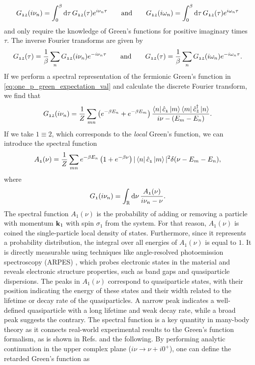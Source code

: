 \documentclass[\main/main.tex]{subfiles}
\begin{document}
\begin{align}
	G_{\mathfrak{12}}(i\nu_n)=\int_{0}^{\beta}\text{d}\tau\,G_{\mathfrak{12}}(\tau) e^{i\nu_n\tau} \qquad\text{and}\qquad G_{\mathfrak{12}}(i\omega_n)=\int_{0}^{\beta}\text{d}\tau\,G_{\mathfrak{12}}(\tau) e^{i\omega_n\tau}
\end{align}
and only require the knowledge of Green's functions for positive imaginary times $\tau$. The inverse Fourier transforms are given by
\begin{align}
	G_{\mathfrak{12}}(\tau)=\frac1\beta \sum_n G_{\mathfrak{12}}(i\nu_n) e^{-i\nu_n\tau} \qquad\text{and}\qquad G_{\mathfrak{12}}(\tau)=\frac1\beta \sum_n G_{\mathfrak{12}}(i\omega_n) e^{-i\omega_n\tau}.
\end{align}
If we perform a spectral representation of the fermionic Green's function in \eqref{eq:one_p_green_expectation_val} and calculate the discrete Fourier transform, we find that
\begin{align}
	G_{\mathfrak{12}}(i\nu_n)=\frac1Z\sum_{mn}\left (e^{-\beta E_n}+e^{-\beta E_m}\right )\frac{\bra{n} \hat c_{\mathfrak{1}} \ket{m}\bra{m} \hat c^{\dagger}_{\mathfrak{2}} \ket{n}}{i\nu-(E_m-E_n)}.
\end{align}
If we take $\mathfrak{1}\equiv \mathfrak{2}$, which corresponds to the \textit{local} Green's function, we can introduce the spectral function
\begin{align}
	A_{\mathfrak{1}}(\nu)=\frac1Z\sum_{mn} e^{-\beta E_n}\left (1+e^{-\beta\nu}\right ) |\bra{n} \hat c_{\mathfrak{1}} \ket{m}|^2 \delta(\nu-E_m-E_n),
\end{align}
where
\begin{align}
	G_{\mathfrak{1}}(i\nu_n)=\int_{\mathbb{R}}^{}\text{d}\nu\,\frac{A_{\mathfrak{1}}(\nu)}{i\nu_n-\nu}.
\end{align}
The spectral function $A_{\mathfrak{1}}(\nu)$ is the probability of adding or removing a particle with momentum $\textbf{k}_1$ with spin $\sigma_1$ from the system. For that reason, $A_{\mathfrak{1}}(\nu)$ is coined the single-particle local density of states. Furthermore, since it represents a probability distribution, the integral over all energies of $A_{\mathfrak{1}}(\nu)$ is equal to $1$. It is directly measurable using techniques like angle-resolved photoemission spectroscopy (ARPES) \cite{Hwang2008, Jang2017}, which probes electronic states in the material and reveals electronic structure properties, such as band gaps and quasiparticle dispersions. The peaks in $A_{\mathfrak{1}}(\nu)$ correspond to quasiparticle states, with their position indicating the energy of these states and their width related to the lifetime or decay rate of the quasiparticles. A narrow peak indicates a well-defined quasiparticle with a long lifetime and weak decay rate, while a broad peak suggests the contrary. The spectral function is a key quantity in many-body theory as it connects real-world experimental results to the Green's function formalism, as is shown in Refs. \cite{Hwang2008, Jang2017} and the following. By performing analytic continuation in the upper complex plane ($i\nu\to\nu+i0^{+}$), one can define the retarded Green's function as
\end{document}
